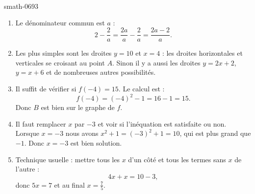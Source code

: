
\begin{corrige}{smath-0693}

    \begin{enumerate}
        \item
            Le dénominateur commun est \( a\) :
            \begin{equation}
                2-\frac{ 2 }{ a }=\frac{ 2a }{ a }-\frac{ 2 }{ a }=\frac{ 2a-2 }{ a }.
            \end{equation}
        \item
            Les plus simples sont les droites \( y=10\) et \( x=4\) :  les droites horizontales et verticales se croisant au point \( A\). Sinon il y a aussi les droites \( y=2x+2\), \( y=x+6\) et de nombreuses autres possibilités.
        \item
            Il suffit de vérifier si \( f(-4)=15\). Le calcul est :
            \begin{equation}
                f(-4)=(-4)^2-1=16-1=15.
            \end{equation}
            Donc \( B\) est bien sur le graphe de \( f\).
        \item
            Il faut remplacer \( x\) par \( -3\) et voir si l'inéquation est satisfaite ou non. Lorsque \( x=-3\) nous avons \( x^2+1=(-3)^2+1=10\), qui est plus grand que \( -1\). Donc \( x=-3\) est bien solution.
        \item
            Technique usuelle : mettre tous les \( x\) d'un côté et tous les termes sans \( x\) de l'autre :
            \begin{equation}
                4x+x=10-3,
            \end{equation}
            donc \( 5x=7\) et au final \( x=\frac{ 7 }{ 5 }\).
    \end{enumerate}

\end{corrige}
